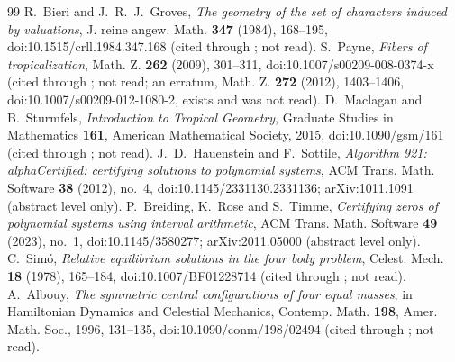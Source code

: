 \documentclass[11pt]{article}
\theoremstyle{definition}
\theoremstyle{remark}
\begin{document}
\begin{thebibliography}{99}
 R.~Bieri and J.~R.~J.~Groves, \emph{The geometry of the set of characters induced by valuations},
J. reine angew. Math. \textbf{347} (1984), 168--195, doi:10.1515/crll.1984.347.168 (cited through \cite{JL25}; not read).
 S.~Payne, \emph{Fibers of tropicalization}, Math. Z. \textbf{262} (2009), 301--311,
doi:10.1007/s00209-008-0374-x (cited through \cite{JL25}; not read; an erratum, Math. Z. \textbf{272} (2012),
1403--1406, doi:10.1007/s00209-012-1080-2, exists and was not read).
 D.~Maclagan and B.~Sturmfels, \emph{Introduction to Tropical Geometry}, Graduate Studies in
Mathematics \textbf{161}, American Mathematical Society, 2015, doi:10.1090/gsm/161 (cited through \cite{JL25}; not read).
 J.~D.~Hauenstein and F.~Sottile, \emph{Algorithm 921: alphaCertified: certifying solutions to
polynomial systems}, ACM Trans. Math. Software \textbf{38} (2012), no.~4, doi:10.1145/2331130.2331136;
arXiv:1011.1091 (abstract level only).
 P.~Breiding, K.~Rose and S.~Timme, \emph{Certifying zeros of polynomial systems using interval
arithmetic}, ACM Trans. Math. Software \textbf{49} (2023), no.~1, doi:10.1145/3580277; arXiv:2011.05000
(abstract level only).
 C.~Sim\'o, \emph{Relative equilibrium solutions in the four body problem}, Celest. Mech.
\textbf{18} (1978), 165--184, doi:10.1007/BF01228714 (cited through \cite{MZ19}; not read).
 A.~Albouy, \emph{The symmetric central configurations of four equal masses}, in Hamiltonian
Dynamics and Celestial Mechanics, Contemp. Math. \textbf{198}, Amer. Math. Soc., 1996, 131--135,
doi:10.1090/conm/198/02494 (cited through \cite{MZ19}; not read).
\end{thebibliography}
\end{document}
